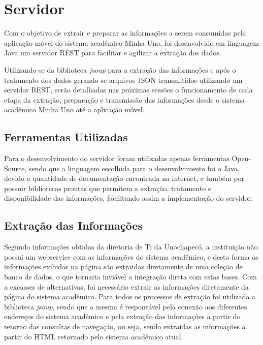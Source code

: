 \chapter{Servidor}
Com o objetivo de extrair e preparar as informações a serem consumidas pela aplicação móvel do sistema acadêmico Minha Uno, foi desenvolvido em linguagem Java um servidor REST para facilitar e agilizar a extração dos dados. 

Utilizando-se da biblioteca \emph{jsoup} para a extração das informações e após o tratamento dos dados gerando-se arquivos JSON transmitidos utilizando um servidor REST, serão detalhadas nas próximas sessões o funcionamento de cada etapa da extração, preparação e transmissão das informações desde o sistema acadêmico Minha Uno até a aplicação móvel.

\section{Ferramentas Utilizadas}
Para o desenvolvimento do servidor foram utilizadas apenas ferramentas Open-Source, sendo que a linguagem escolhida para o desenvolvimento foi o Java, devido a quantidade de documentação encontrada na internet, e também por possuir bibliotecas prontas que permitem a extração, tratamento e disponibilidade das informações, facilitando assim a implementação do servidor.

\section{Extração das Informações}

Segundo informações obtidas da diretoria de Ti da Unochapecó, a instituição não possui um webservice com as informações do sistema acadêmico, e desta forma as informações exibidas na página são extraidas diretamente de uma coleção de banco de dados, o que tornaria inviável a integração direta com estas bases. Com a excasses de alternativas, foi necessário extrair as informações diretamente da página do sistema acadêmico. Para todos os processos de extração foi utilizada a biblioteca \emph{jsoup}, sendo que a mesma é responsável pela conexão aos diferentes endereços do sistema acadêmico e pela extração das informações a partir do retorno das consultas de navegação, ou seja, sendo extraidas as informações a partir do HTML retornado pelo sistema acadêmico atual.


